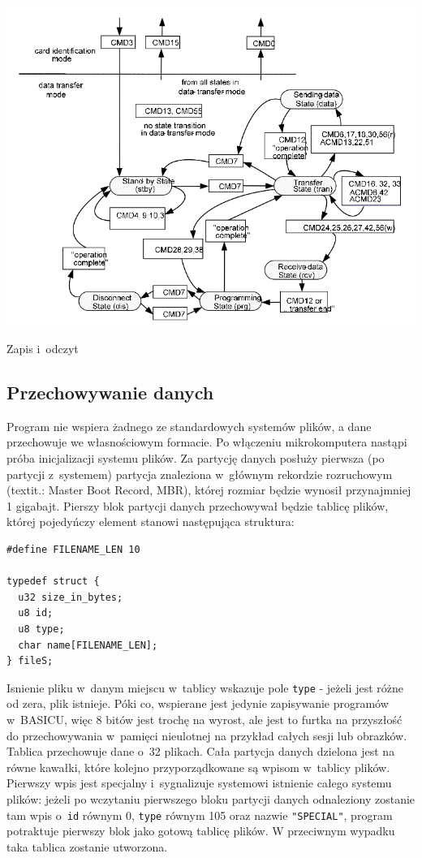 \documentclass[shortabstract]{iithesis}
\begin{document}
\begingroup
\centering
\includegraphics[width=\textwidth]{sd-transfer.png}
\captionsetup{type=figure}
\caption{Zapis i~odczyt}
\endgroup

\subsection{Przechowywanie danych}
Program nie wspiera żadnego ze standardowych systemów plików, a dane przechowuje we własnościowym formacie. Po włączeniu mikrokomputera nastąpi próba inicjalizacji systemu plików. Za partycję danych posłuży pierwsza (po partycji z~systemem) partycja znaleziona w~głównym rekordzie rozruchowym (textit{.: Master Boot Record, MBR}), której rozmiar będzie wynosił przynajmniej 1 gigabajt. Pierszy blok partycji danych przechowywał będzie tablicę plików, której pojedyńczy element stanowi następująca struktura:
\begin{verbatim}
#define FILENAME_LEN 10

typedef struct {
  u32 size_in_bytes;
  u8 id;
  u8 type;
  char name[FILENAME_LEN];
} fileS;
\end{verbatim}

Isnienie pliku w~danym miejscu w~tablicy wskazuje pole \texttt{type} - jeżeli jest różne od zera, plik istnieje. Póki co, wspierane jest jedynie zapisywanie programów w~BASICU, więc 8 bitów jest trochę na wyrost, ale jest to furtka na przyszłość do przechowywania w~pamięci nieulotnej na przykład całych sesji lub obrazków. Tablica przechowuje dane o~32 plikach. Cała partycja danych dzielona jest na równe kawałki, które kolejno przyporządkowane są wpisom w~tablicy plików. Pierwszy wpis jest specjalny i~sygnalizuje systemowi istnienie całego systemu plików: jeżeli po wczytaniu pierwszego bloku partycji danych odnaleziony zostanie tam wpis o~\texttt{id} równym 0, \texttt{type} równym 105 oraz nazwie \texttt{"SPECIAL"}, program potraktuje pierwszy blok jako gotową tablicę plików. W przeciwnym wypadku taka tablica zostanie utworzona.
\end{document}
